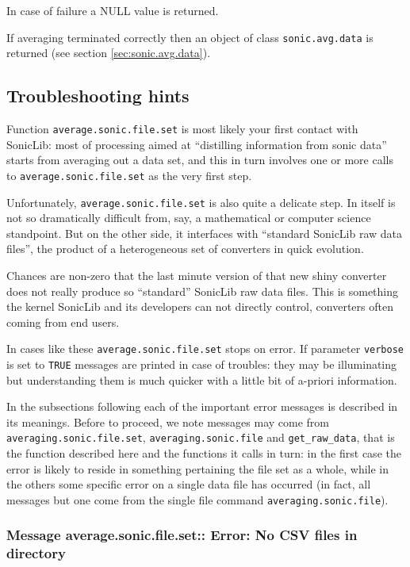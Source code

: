 \documentclass[a4paper,10pt]{book}
\begin{document}
In case of failure a NULL value is returned.

If averaging terminated correctly then an object of class \verb|sonic.avg.data| is returned (see section \ref{sec:sonic.avg.data}).

\subsection{Troubleshooting hints}

Function \verb|average.sonic.file.set| is most likely your first contact with SonicLib: most of processing aimed at ``distilling information from sonic data'' starts from averaging out a data set, and this in turn involves one or more calls to \verb|average.sonic.file.set| as the very first step.

Unfortunately, \verb|average.sonic.file.set| is also quite a delicate step. In itself is not so dramatically difficult from, say, a mathematical or computer science standpoint. But on the other side, it interfaces with ``standard SonicLib raw data files'', the product of a heterogeneous set of converters in quick evolution.

Chances are non-zero that the last minute version of that new shiny converter does not really produce so ``standard'' SonicLib raw data files. This is something the kernel SonicLib and its developers can not directly control, converters often coming from end users.

In cases like these \verb|average.sonic.file.set| stops on error. If parameter \verb|verbose| is set to \verb|TRUE| messages are printed in case of troubles: they may be illuminating but understanding them is much quicker with a little bit of a-priori information.

In the subsections following each of the important error messages is described in its meanings. Before to proceed, we note messages may come from \verb|averaging.sonic.file.set|, \verb|averaging.sonic.file| and \verb|get_raw_data|, that is the function described here and the functions it calls in turn: in the first case the error is likely to reside in something pertaining the file set as a whole, while in the others some specific error on a single data file has occurred (in fact, all messages but one come from the single file command \verb|averaging.sonic.file|).

\subsubsection{Message average.sonic.file.set:: Error: No CSV files in directory}
\end{document}
